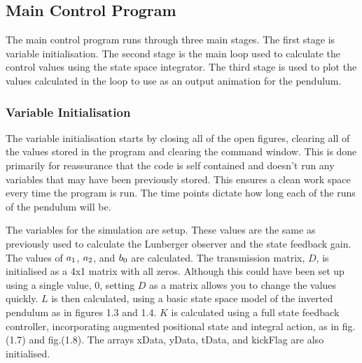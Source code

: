 \documentclass[11pt]{report}
\begin{document}
\subsection{Main Control Program}

The main control program runs through three main stages. The first stage is variable initialisation. The second stage is the main loop used to calculate the control values using the state space integrator. The third stage is used to plot the values calculated in the loop to use as an output animation for the pendulum.

\subsubsection{Variable Initialisation}

The variable initialisation starts by closing all of the open figures, clearing all of the values stored in the program and clearing the command window. This is done primarily for reassurance that the code is self contained and doesn't run any variables that may have been previously stored. This ensures a clean work space every time the program is run. 
The time points dictate how long each of the runs of the pendulum will be.

The variables for the simulation are setup. These values are the same as previously used to calculate the Lunberger observer and the state feedback gain. The values of $a\textsubscript{1}$, $a\textsubscript{2}$, and $b\textsubscript{0}$ are calculated. The transmission matrix, $D$, is initialised as a 4x1 matrix with all zeros. Although this could have been set up using a single value, 0, setting $D$ as a matrix allows you to change the values quickly. $L$ is then calculated, using a basic state space model of the inverted pendulum as in figures 1.3 and 1.4. $K$ is calculated using a full state feedback controller, incorporating augmented positional state and integral action, as in fig.(1.7) and fig.(1.8). The arrays xData, yData, tData, and kickFlag are also initialised. 
\end{document}

